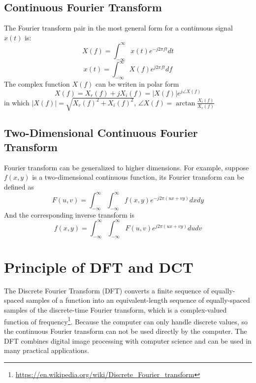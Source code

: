 \documentclass[journal,comsoc]{IEEEtran}
\begin{document}
\subsection{Continuous Fourier Transform}
\label{subsec:continuous fourier transform}
The Fourier transform pair in the most general form for a continuous signal $x(t)$ is:
\begin{equation}
  \label{cft}
  X(f)=\int_{-\infty}^{\infty}{x(t)e^{-j2\pi{ft}}dt}
\end{equation}
\begin{equation}
  \label{icft}
  x(t)=\int_{-\infty}^{\infty}X(f)e^{j2\pi{ft}}df
\end{equation}
The complex function $X(f)$ can be writen in polar form
\begin{equation}
  \label{x_f_polar}
  X(f)=X_r(f)+jX_i(f)=|X(f)|e^{j\angle{X(f)}}
\end{equation}
in which $|X(f)|=\sqrt{X_r(f)^2+X_i(f)^2}$, $\angle{X(f)}=\arctan{\frac{X_i(f)}{X_r(f)}}$

\subsection{Two-Dimensional Continuous Fourier Transform}
\label{subsec:two-dimensional continuous fourier transform}
Fourier transform can be generalized to higher dimensions. For example, suppose $f(x,y)$
is a two-dimensional continuous function, its Fourier transform can be defined as
\begin{equation}
  \label{two-cft}
  F(u,v)=\int_{-\infty}^{\infty}\int_{-\infty}^{\infty}f(x,y)e^{-j2\pi{(ux+vy)}}dxdy
\end{equation}
And the corresponding inverse transform is
\begin{equation}
  \label{two-icft}
  f(x,y)=\int_{-\infty}^{\infty}\int_{-\infty}^{\infty}F(u,v)e^{j2\pi{(ux+vy)}}dudv
\end{equation}

\section{Principle of DFT and DCT}
\label{sec:principle of dft and dct}

The Discrete Fourier Transform (DFT) converts a finite sequence of equally-spaced samples of
a function into an equivalent-length sequence of equally-spaced samples of the discrete-time
Fourier transform, which is a complex-valued function of
frequency\footnote{\url{https://en.wikipedia.org/wiki/Discrete_Fourier_transform}}.%
Because the computer can only handle discrete values, so the continuous Fourier transform can not
be used directly by the computer. The DFT combines digital image processing with computer science
and can be used in many practical applications.
\end{document}
